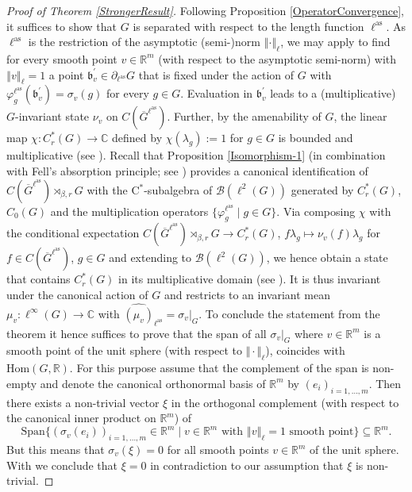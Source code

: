 \documentclass[a4paper,11pt,reqno]{amsart}
\numberwithin{equation}{section}
\numberwithin{equation}{section}
\theoremstyle{definition}
\theoremstyle{remark}
\theoremstyle{remark}
\begin{document}
\begin{proof}[{Proof of Theorem \ref{StrongerResult}}] Following
Proposition \ref{OperatorConvergence}, it suffices to show that $G$
is separated with respect to the length function $\ell^{\text{as}}$. As $\ell^{\text{as}}$ is the
restriction of the asymptotic (semi-)norm $\left\Vert \cdot\right\Vert _{\ell}$,
we may apply \cite[Proposition 7.4]{Rieffel02} to find for every
smooth point $v\in\mathbb{R}^{m}$ (with respect to the asymptotic semi-norm) with $\left\Vert v\right\Vert _{\ell}=1$
a point $\mathfrak{b}_{v}^{\prime}\in\partial_{\ell^{\text{as}}}G$ that
is fixed under the action of $G$ with $\varphi_{g}^{\ell^{\text{as}}}(\mathfrak{b}_{v}^{\prime})=\sigma_{v}(g)$
for every $g\in G$. Evaluation in $\mathfrak{b}_{v}^{\prime}$ leads
to a (multiplicative) $G$-invariant state $\nu_{v}$ on $C(\overline{G}^{\ell^{\text{as}}})$.
Further, by the amenability of $G$, the linear map $\chi:C_{r}^{\ast}(G)\rightarrow\mathbb{C}$
defined by $\chi(\lambda_{g}):=1$ for $g\in G$ is bounded and multiplicative
(see \cite[Theorem 2.6.8]{BrownOzawa}). Recall that Proposition \ref{Isomorphism-1} (in combination with Fell's absorption principle; see \cite[Proposition 4.1.7]{BrownOzawa})
provides a canonical identification of $C(\overline{G}^{\ell^{\text{as}}})\rtimes_{\beta,r}G$
with the C$^{\ast}$-subalgebra of $\mathcal{B}(\ell^{2}(G))$ generated
by $C_{r}^{\ast}(G)$, $C_{0}(G)$ and the multiplication operators
$\{\varphi_{g}^{\ell^{\text{as}}}\mid g\in G\}$. Via composing $\chi$ with
the conditional expectation $C(\overline{G}^{\ell^{\text{as}}})\rtimes_{\beta,r}G\rightarrow C_{r}^{\ast}(G)$,
$f\lambda_{g}\mapsto\nu_{v}(f)\lambda_{g}$ for $f\in C(\overline{G}^{\ell^{\text{as}}})$,
$g\in G$ and extending to $\mathcal{B}(\ell^{2}(G))$, we hence obtain
a state that contains $C_{r}^{\ast}(G)$ in its multiplicative domain
(see \cite[Proposition 1.5.7]{BrownOzawa}). It is thus invariant
under the canonical action of $G$ and restricts to an invariant mean
$\mu_{v}:\ell^{\infty}(G)\rightarrow\mathbb{C}$ with $\widehat{(\mu_{v})}_{\ell^{\text{as}}}=\sigma_{v}|_{G}$.
To conclude the statement from the theorem it hence suffices to prove
that the span of all $\sigma_{v}|_G$ where $v\in\mathbb{R}^{m}$ is
a smooth point of the unit sphere (with respect to $\Vert \cdot \Vert_\ell$), coincides with $\text{Hom}(G,\mathbb{R})$.
For this purpose assume that the complement of the span is non-empty
and denote the canonical orthonormal basis of $\mathbb{R}^{m}$ by
$(e_{i})_{i=1,...,m}$. Then there exists a non-trivial vector $\xi$
in the orthogonal complement (with respect to the canonical inner
product on $\mathbb{R}^{m}$) of 
\[
\text{Span}\{(\sigma_{v}(e_{i}))_{i=1,...,m}\in\mathbb{R}^{m}\mid v\in\mathbb{R}^{m}\text{ with }\left\Vert v\right\Vert _{\ell}=1\text{ smooth point}\}\subseteq\mathbb{R}^{m}.
\]
But this means that $\sigma_{v}(\xi)=0$ for all smooth points $v\in\mathbb{R}^{m}$
of the unit sphere. With \cite[Proposition 6.7]{Rieffel02} we conclude
that $\xi=0$ in contradiction to our assumption that $\xi$ is non-trivial.
\end{proof}
\end{document}
